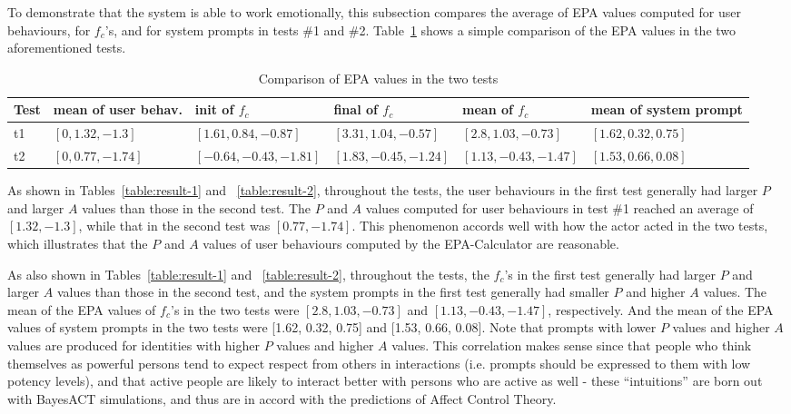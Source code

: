 To demonstrate that the system is able to work emotionally, this subsection compares the average of EPA values computed for user behaviours, for $f_c$'s, and for system prompts in tests \#1 and \#2. Table~\ref{table:compare-epa-the-two} shows a simple comparison of the EPA values in the two aforementioned tests. 

%
\begin{table}\footnotesize
\centering
\caption{Comparison of EPA values in the two tests}
\label{table:compare-epa-the-two}
\begin{tabular}{|  p{0.5cm} | p{2.1cm} |  p{3.1cm} |  p{2.9cm} |  p{2.9cm} | p{2.3cm} |}
\hline
Test & mean of user behav. & init of $f_c$ & final of $f_c$ & mean of $f_c$ & mean of system prompt \\ \hline
t1 & $[0,1.32,-1.3]$ & $[1.61,0.84,-0.87]$ & $[3.31,1.04,-0.57]$ & $[2.8,1.03,-0.73]$ & $[1.62,0.32,0.75]$ \\ \hline
t2 & $[0,0.77,-1.74]$ & $[-0.64,-0.43,-1.81]$ & $[1.83,-0.45,-1.24]$ & $[1.13,-0.43,-1.47]$ & $[1.53,0.66,0.08]$ \\ \hline
\end{tabular}
\end{table}

As shown in Tables~\ref{table:result-1} and ~\ref{table:result-2}, throughout the tests, the user behaviours in the first test generally had larger $P$ and larger $A$ values than those in the second test. The $P$ and $A$ values computed for user behaviours in test \#1 reached an average of $[1.32, -1.3]$, while that in the second test was $[0.77, -1.74]$. This phenomenon accords well with how the actor acted in the two tests, which illustrates that the $P$ and $A$ values of user behaviours computed by the EPA-Calculator are reasonable.

As also shown in Tables~\ref{table:result-1} and ~\ref{table:result-2}, throughout the tests, the $f_c$'s in the first test generally had larger $P$ and larger $A$ values than those in the second test, and the system prompts in the first test generally had smaller $P$ and higher $A$ values. The mean of the EPA values of $f_c$'s in the two tests were $[2.8, 1.03, -0.73]$ and $[1.13, -0.43, -1.47]$, respectively. And the mean of the EPA values of system prompts in the two tests were [1.62, 0.32, 0.75] and [1.53, 0.66, 0.08]. Note that prompts with lower $P$ values and higher $A$ values are produced for identities with higher $P$ values and higher $A$ values. This correlation makes sense since that people who think themselves as powerful persons tend to expect respect from others in interactions (i.e. prompts should be expressed to them with low potency levels), and that active people are likely to interact better with persons who are active as well - these ``intuitions'' are born out with BayesACT simulations, and thus are in accord with the predictions of Affect Control Theory.

